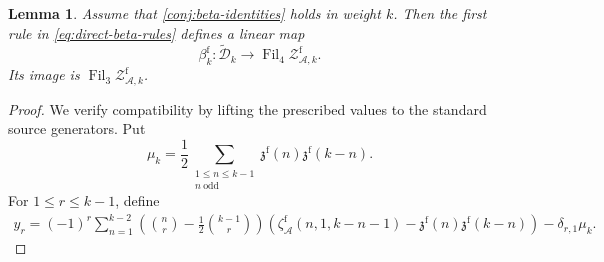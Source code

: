 \documentclass[10pt,a4paper]{amsart}
\newtheorem{lem}{Lemma}
\newcommand{\Dtk}{\widetilde{\mathcal D}_k}
\DeclareMathOperator{\Fil}{Fil}
\newcommand{\ZAfw}[1]{{\mathcal Z_{\mathcal A,#1}^{\mathrm f}}}
\newcommand{\zaf}[1]{\zeta_{\mathcal A}^{\mathrm f}(#1)}
\newcommand{\zzf}[1]{\mathfrak z^{\mathrm f}(#1)}
\begin{document}
\begin{lem}\label{lem:direct-beta-certificate}
Assume that \cref{conj:beta-identities} holds in weight $k$. Then the
first rule in \eqref{eq:direct-beta-rules} defines a linear map
\[
 \beta_k^{\mathrm f}:\Dtk\longrightarrow\Fil_4\ZAfw{k}.
\]
Its image is $\Fil_3\ZAfw{k}$.
\end{lem}

\begin{proof}
We verify compatibility by lifting the prescribed values to the standard
source generators. Put
\[
 \mu_k=\frac12
 \sum_{\substack{1\leq n\leq k-1\\n\ \mathrm{odd}}}
 \zzf n\zzf{k-n}.
\]
For $1\leq r\leq k-1$, define
\begin{align}\label{eq:direct-beta-certificate}
 y_r=(-1)^r\sum_{n=1}^{k-2}
 \left(\binom nr-\frac12\binom{k-1}r\right)
 \left(\zaf{n,1,k-n-1}-\zzf n\zzf{k-n}\right)
 -\delta_{r,1}\mu_k.
\end{align}


\end{proof}
\end{document}
